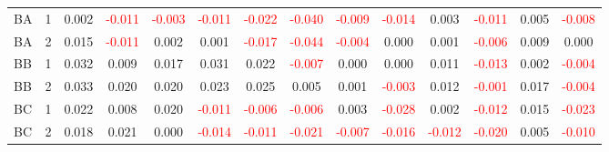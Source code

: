 \begin{table}[H]
{\begin{tabular}{llcccccccccccc}
BA & 1 & 0.002 & \textcolor{red}{-0.011} & \textcolor{red}{-0.003} & \textcolor{red}{-0.011} & \textcolor{red}{-0.022} & \textcolor{red}{-0.040} & \textcolor{red}{-0.009} & \textcolor{red}{-0.014} & 0.003 & \textcolor{red}{-0.011} & 0.005 & \textcolor{red}{-0.008}\\
BA & 2 & 0.015 & \textcolor{red}{-0.011} & 0.002 & 0.001 & \textcolor{red}{-0.017} & \textcolor{red}{-0.044} & \textcolor{red}{-0.004} & 0.000 & 0.001 & \textcolor{red}{-0.006} & 0.009 & 0.000\\
BB & 1 & 0.032 & 0.009 & 0.017 & 0.031 & 0.022 & \textcolor{red}{-0.007} & 0.000 & 0.000 & 0.011 & \textcolor{red}{-0.013} & 0.002 & \textcolor{red}{-0.004}\\
BB & 2 & 0.033 & 0.020 & 0.020 & 0.023 & 0.025 & 0.005 & 0.001 & \textcolor{red}{-0.003} & 0.012 & \textcolor{red}{-0.001} & 0.017 & \textcolor{red}{-0.004}\\
BC & 1 & 0.022 & 0.008 & 0.020 & \textcolor{red}{-0.011} & \textcolor{red}{-0.006} & \textcolor{red}{-0.006} & 0.003 & \textcolor{red}{-0.028} & 0.002 & \textcolor{red}{-0.012} & 0.015 & \textcolor{red}{-0.023}\\
BC & 2 & 0.018 & 0.021 & 0.000 & \textcolor{red}{-0.014} & \textcolor{red}{-0.011} & \textcolor{red}{-0.021} & \textcolor{red}{-0.007} & \textcolor{red}{-0.016} & \textcolor{red}{-0.012} & \textcolor{red}{-0.020} & 0.005 & \textcolor{red}{-0.010}\\
\hline
    \end{tabular}%
    }
    \label{tab:cen8_cov}
\end{table}

